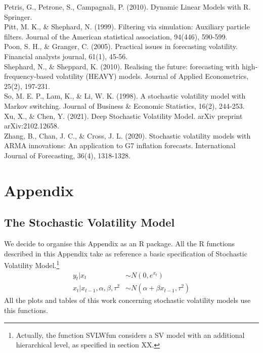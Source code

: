 \documentclass[
]{book}
\theoremstyle{break}
\theoremstyle{nonumberplain}
\begin{document}
Petris, G., Petrone, S., Campagnali, P. (2010). Dynamic Linear Models
with R. Springer.\\

Pitt, M. K., \& Shephard, N. (1999). Filtering via simulation: Auxiliary
particle filters. Journal of the American statistical association,
94(446), 590-599.\\

Poon, S. H., \& Granger, C. (2005). Practical issues in forecasting
volatility. Financial analysts journal, 61(1), 45-56.\\

Shephard, N., \& Sheppard, K. (2010). Realising the future: forecasting
with high‐frequency‐based volatility (HEAVY) models. Journal of Applied
Econometrics, 25(2), 197-231.\\

So, M. E. P., Lam, K., \& Li, W. K. (1998). A stochastic volatility
model with Markov switching. Journal of Business \& Economic Statistics,
16(2), 244-253.\\

Xu, X., \& Chen, Y. (2021). Deep Stochastic Volatility Model. arXiv
preprint arXiv:2102.12658.\\

Zhang, B., Chan, J. C., \& Cross, J. L. (2020). Stochastic volatility
models with ARMA innovations: An application to G7 inflation forecasts.
International Journal of Forecasting, 36(4), 1318-1328.

\chapter*{Appendix}
\section{The Stochastic Volatility Model}

We decide to organise this Appendix as an R package. All the R functions
described in this Appendix take as reference a basic specification of
Stochastic Volatility
Model.\footnote{Actually, the function SVLWfun considers a SV model with an additional hierarchical level, as specified in section XX.}
\begin{align*}
    y_t|x_t & \sim N(0,e^{x_t})\\
    x_t|x_{t-1},\alpha,\beta,\tau^2 & \sim N(\alpha+\beta x_{t-1},\tau^2)
\end{align*} All the plots and tables of this work concerning stochastic
volatility models use this functions.
\end{document}
